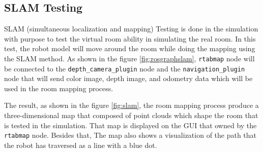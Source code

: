 \subsection{SLAM Testing}
\label{subsec:slamtesting}



SLAM (simultaneous localization and mapping) Testing is done in the simulation with purpose to test the virtual room ability in simulating the real room.
In this test,
  the robot model will move around the room while doing the mapping using the SLAM method.
As shown in the figure \ref{fig:rosgraphslam},
  \lstinline{rtabmap} node will be connected to the \lstinline{depth_camera_plugin} node and the \lstinline{navigation_plugin} node that will send color image, depth image, and odometry data which will be used in the room mapping process.



The result,
  as shown in the figure \ref{fig:slam},
  the room mapping process produce a three-dimensional map that composed of point clouds which shape the room that is tested in the simulation.
That map is displayed on the GUI that owned by the \lstinline{rtabmap} node.
Besides that,
  The map also shows a visualization of the path that the robot has traversed as a line with a blue dot.
